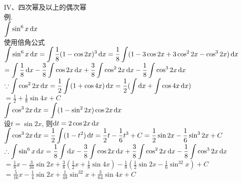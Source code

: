 IV、四次幂及以上的偶次幂\\
例.\\
\phantom{例}$\displaystyle\int\sin^6x\dif x$\\
使用倍角公式\\
$\displaystyle\int\sin^6x\mathop{}\!\mathrm{d} x=\int\frac{1}{8}(1-\cos2x)^3\mathop{}\!\mathrm{d} x=\frac{1}{8}\int(1-3\cos2x+3\cos^22x-\cos^32x)\mathop{}\!\mathrm{d} x$\\
\phantom{$\displaystyle\int\sin^6x\dif x$}$\displaystyle=\int\frac{1}{8}\mathop{}\!\mathrm{d} x-\frac{3}{8}\int\cos2x\mathop{}\!\mathrm{d} x+\frac{3}{8}\int\cos^22x\mathop{}\!\mathrm{d} x-\frac{1}{8}\int\cos^32x\mathop{}\!\mathrm{d} x$\\
$\displaystyle\because\int\cos^22x\mathop{}\!\mathrm{d} x=\frac{1}{2}\int(1+\cos4x)\mathop{}\!\mathrm{d} x=\frac{1}{2}(\int\mathop{}\!\mathrm{d} x+\int\cos4x\mathop{}\!\mathrm{d} x)$\\
\phantom{$\displaystyle\because\int\cos^22x\dif x$}$\displaystyle=\frac{1}{2}+\frac{1}{8}\sin4x+C$\\
\phantom{$\displaystyle\because$}$\displaystyle\int\cos^32x\mathop{}\!\mathrm{d} x=\int(1-\sin^22x)\cos2x\mathop{}\!\mathrm{d} x$\\
\phantom{$\displaystyle\because$}设$t=\sin2x$, 则$\mathop{}\!\mathrm{d} t=2\cos2x\mathop{}\!\mathrm{d} x$\\
\phantom{$\displaystyle\because$}$\displaystyle\int\cos^32x\mathop{}\!\mathrm{d} x=\frac{1}{2}\int(1-t^2)\mathop{}\!\mathrm{d} t=\frac{1}{2}t-\frac{1}{6}t^3+C=\frac{1}{2}\sin2x-\frac{1}{6}\sin^32x+C$\\
$\displaystyle\therefore\int\sin^6x\mathop{}\!\mathrm{d} x=\frac{1}{8}\int\mathop{}\!\mathrm{d} x-\frac{3}{8}\int\cos2x\mathop{}\!\mathrm{d} x+\frac{3}{8}\int\cos^22x\mathop{}\!\mathrm{d} x-\frac{1}{8}\int\cos^32x\mathop{}\!\mathrm{d} x$\\
\phantom{$\displaystyle\therefore\int\sin^6x\dif x$}$\displaystyle=\frac{1}{8}x-\frac{3}{16}\sin2x+\frac{3}{8}(\frac{1}{2}x+\frac{1}{8}\sin4x)-\frac{1}{8}(\frac{1}{2}\sin2x-\frac{1}{6}\sin^32x)+C$\\
\phantom{$\displaystyle\therefore\int\sin^6x\dif x$}$\displaystyle=\frac{5}{16}x-\frac{1}{4}\sin2x+\frac{1}{48}\sin^32x+\frac{3}{64}\sin4x+C$\\


